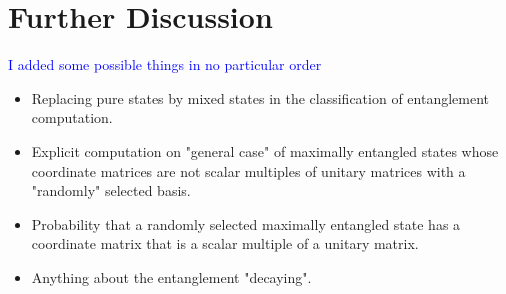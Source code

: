 
\chapter{Further Discussion} %

\label{Chapter7-further discussion} %

\textcolor{blue}{I added some possible things in no particular order}

\begin{itemize}
\item Replacing pure states by mixed states in the classification of entanglement computation.
\item Explicit computation on "general case" of maximally entangled states whose coordinate matrices are not scalar multiples of unitary matrices with a "randomly" selected basis.
\item Probability that a randomly selected maximally entangled state has a coordinate matrix that is a scalar multiple of a unitary matrix.
\item Anything about the entanglement "decaying".
\end{itemize}